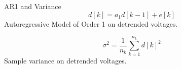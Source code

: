 \begin{frame}{AR1 and Variance}
	\begin{equation}
		\label{eq:autocorrDef}
		d[k] = a_1 d[k-1] + e[k]
	\end{equation} 
	Autoregressive Model of Order 1 on detrended voltages.
	
	\begin{equation}
		\label{eq:varDef}
		\sigma^2 = \frac{1}{n_k} \sum_{k=1}^{n_k} d[k]^2
	\end{equation} 
	Sample variance on detrended voltages.
\end{frame}